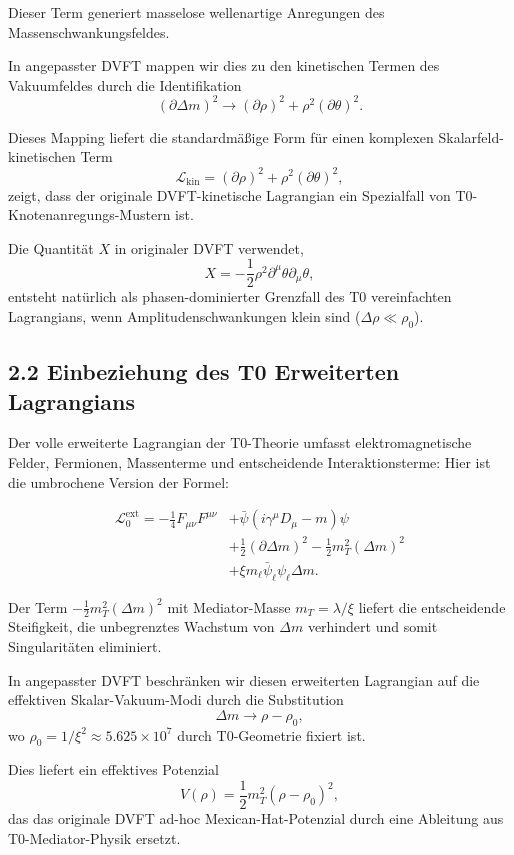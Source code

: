 	Dieser Term generiert masselose wellenartige Anregungen des Massenschwankungsfeldes.
	
	In angepasster DVFT mappen wir dies zu den kinetischen Termen des Vakuumfeldes durch die Identifikation
	\[
	(\partial \Delta m)^2 \to (\partial \rho)^2 + \rho^2 (\partial \theta)^2.
	\]
	
	Dieses Mapping liefert die standardmäßige Form für einen komplexen Skalarfeld-kinetischen Term
	\[
	\mathcal{L}_{\text{kin}} = (\partial \rho)^2 + \rho^2 (\partial \theta)^2,
	\]
	zeigt, dass der originale DVFT-kinetische Lagrangian ein Spezialfall von T0-Knotenanregungs-Mustern ist.
	
	Die Quantität $X$ in originaler DVFT verwendet,
	\[
	X = -\frac{1}{2} \rho^2 \partial^\mu \theta \partial_\mu \theta,
	\]
	entsteht natürlich als phasen-dominierter Grenzfall des T0 vereinfachten Lagrangians, wenn Amplitudenschwankungen klein sind ($\Delta \rho \ll \rho_0$).
	
	\subsection{2.2 Einbeziehung des T0 Erweiterten Lagrangians}
	
	Der volle erweiterte Lagrangian der T0-Theorie umfasst elektromagnetische Felder, Fermionen, Massenterme und entscheidende Interaktionsterme:
Hier ist die umbrochene Version der Formel:

\[
\begin{aligned}
	\mathcal{L}_0^{\text{ext}} = -\frac{1}{4} F_{\mu\nu}F^{\mu\nu} &+ \bar{\psi}(i\gamma^\mu D_\mu - m)\psi \\
	&+ \frac{1}{2}(\partial \Delta m)^2 - \frac{1}{2} m_T^2 (\Delta m)^2 \\
	&+ \xi m_\ell \bar{\psi}_\ell \psi_\ell \Delta m.
\end{aligned}
\]
	
	Der Term $-\frac{1}{2} m_T^2 (\Delta m)^2$ mit Mediator-Masse $m_T = \lambda / \xi$ liefert die entscheidende Steifigkeit, die unbegrenztes Wachstum von $\Delta m$ verhindert und somit Singularitäten eliminiert.
	
	In angepasster DVFT beschränken wir diesen erweiterten Lagrangian auf die effektiven Skalar-Vakuum-Modi durch die Substitution
	\[
	\Delta m \to \rho - \rho_0,
	\]
	wo $\rho_0 = 1/\xi^2 \approx 5.625 \times 10^7$ durch T0-Geometrie fixiert ist.
	
	Dies liefert ein effektives Potenzial
	\[
	V(\rho) = \frac{1}{2} m_T^2 (\rho - \rho_0)^2,
	\]
	das das originale DVFT ad-hoc Mexican-Hat-Potenzial durch eine Ableitung aus T0-Mediator-Physik ersetzt.
	
